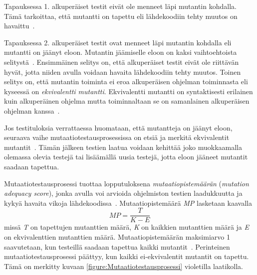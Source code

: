 \documentclass[finnish, grading]{tktltiki2}
\theoremstyle{definition}
\theoremstyle{remark}
\begin{document}
Tapauksessa 1. alkuperäiset testit eivät ole menneet läpi mutantin kohdalla. Tämä tarkoittaa, että mutantti on tapettu eli lähdekoodiin tehty muutos on havaittu~\cite[s. 36]{DeMillo:Lipton:Sayward:1978}.

Tapauksessa 2. alkuperäiset testit ovat menneet läpi mutantin kohdalla eli mutantti on jäänyt eloon. Mutantin jäämiselle eloon on kaksi vaihtoehtoista selitystä~\cite[s. 36]{DeMillo:Lipton:Sayward:1978}. Ensimmäinen selitys on, että alkuperäiset testit eivät ole riittävän hyvät, jotta niiden avulla voidaan havaita lähdekoodiin tehty muutos. Toinen selitys on, että mutantin toiminta ei eroa alkuperäisen ohjelman toiminnasta eli kyseessä on \textit{ekvivalentti mutantti}. Ekvivalentti mutantti on syntaktisesti erilainen kuin alkuperäinen ohjelma mutta toiminnaltaan se on samanlainen alkuperäisen ohjelman kanssa~\cite[s. 652]{Jia:Harman:2011}.

Jos testituloksia verrattaessa huomataan, että mutantteja on jäänyt eloon, seuraava vaihe mutaatiotestausprosessissa on etsiä ja merkitä ekvivalentit mutantit~\cite[s. 36]{Offutt:Untch:2001}. Tämän jälkeen testien laatua voidaan kehittää joko muokkaamalla olemassa olevia testejä tai lisäämällä uusia testejä, jotta eloon jääneet mutantit saadaan tapettua.

Mutaatiotestausprosessi tuottaa lopputuloksena \textit{mutaatiopistemäärän} (\textit{mutation adequacy score}), jonka avulla voi arvioida ohjelmiston testien laadukkuutta ja kykyä havaita vikoja lähdekoodissa~\cite[s. 652]{Jia:Harman:2011}. Mutaatiopistemäärä \textit{MP} lasketaan kaavalla 
\begin{equation}
MP = \frac{T}{K - E}
\end{equation}
missä \textit{T} on tapettujen mutanttien määrä, \textit{K} on kaikkien mutanttien määrä ja \textit{E} on ekvivalenttien mutanttien määrä. Mutaatiopistemäärän maksimiarvo 1 saavutetaan, kun testeillä saadaan tapettua kaikki mutantit~\cite[s. 36]{Offutt:Untch:2001}. Perinteinen mutaatiotestausprosessi päättyy, kun kaikki ei-ekvivalentit mutantit on tapettu. Tämä on merkitty kuvaan \ref{figure:Mutaatiotestausprosessi} violetilla laatikolla.
\end{document}
